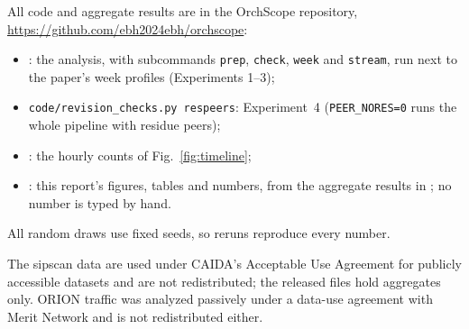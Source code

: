 \documentclass[11pt]{article}
\begin{document}
All code and aggregate results are in the OrchScope repository,
\url{https://github.com/ebh2024ebh/orchscope}:
\begin{itemize}
\item {}: the analysis, with subcommands \texttt{prep}, \texttt{check},
\texttt{week} and \texttt{stream}, run next to the paper's week profiles (Experiments 1--3);
\item \texttt{code/revision\_checks.py respeers}: Experiment~4 (\texttt{PEER\_NORES=0} runs the
whole pipeline with residue peers);
\item {}: the hourly counts of Fig.~\ref{fig:timeline};
\item {}: this report's figures, tables and numbers, from the aggregate
results in ; no number is typed by hand.
\end{itemize}
All random draws use fixed seeds, so reruns reproduce every number.

The sipscan data are used under CAIDA's Acceptable Use Agreement for publicly accessible datasets
and are not redistributed; the released files hold aggregates only. ORION traffic was analyzed
passively under a data-use agreement with Merit Network and is not redistributed either.



\end{document}
